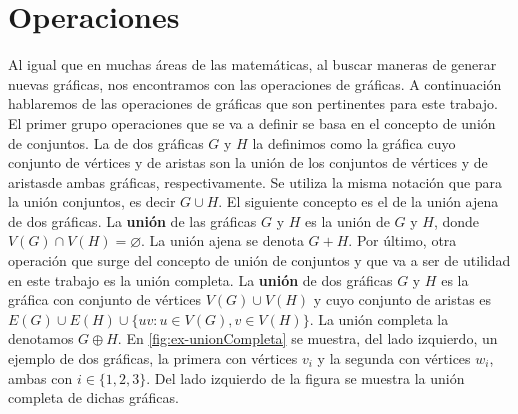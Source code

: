 \section{Operaciones}
\label{sec:operaciones}

Al igual que en muchas \'areas de las matem\'aticas, al buscar maneras de
generar nuevas gr\'aficas, nos encontramos con las operaciones de gr\'aficas. A
continuaci\'on hablaremos de las operaciones de gr\'aficas que son pertinentes
para este trabajo. El primer grupo operaciones que se va a definir se basa en el
concepto de uni\'on de conjuntos. La  de dos gr\'aficas $G$ y
$H$ la definimos como la gr\'afica cuyo conjunto de v\'ertices y de aristas son
la uni\'on de los conjuntos de v\'ertices  y de aristasde ambas gr\'aficas,
respectivamente. Se utiliza la misma notaci\'on que para la uni\'on conjuntos,
es decir $G \cup H$. El siguiente concepto es el de la uni\'on ajena de dos
gr\'aficas. La \textbf{uni\'on}  de las gr\'aficas $G$
y $H$ es la uni\'on de $G$ y $H$, donde $V(G) \cap V(H) = \varnothing$. La
uni\'on ajena se denota $G + H$. Por \'ultimo, otra operaci\'on que surge del
concepto de uni\'on de conjuntos y que va a ser de utilidad en este trabajo es
la uni\'on completa. La \textbf{uni\'on}  de dos
gr\'aficas $G$ y $H$ es la gr\'afica con conjunto de v\'ertices $V(G) \cup V(H)$
y cuyo conjunto de aristas es $E(G) \cup E(H) \cup \{uv \colon u \in V(G), v \in
V(H) \}$. La uni\'on completa la denotamos $G \oplus H$. En \cref{fig:ex-unionCompleta} se muestra, del lado izquierdo, un
ejemplo de dos gr\'aficas, la primera con v\'ertices $v_i$ y la segunda con
v\'ertices $w_i$, ambas con $i \in \{1, 2 ,3\}$. Del lado izquierdo de la figura
se muestra la uni\'on completa de dichas gr\'aficas.

